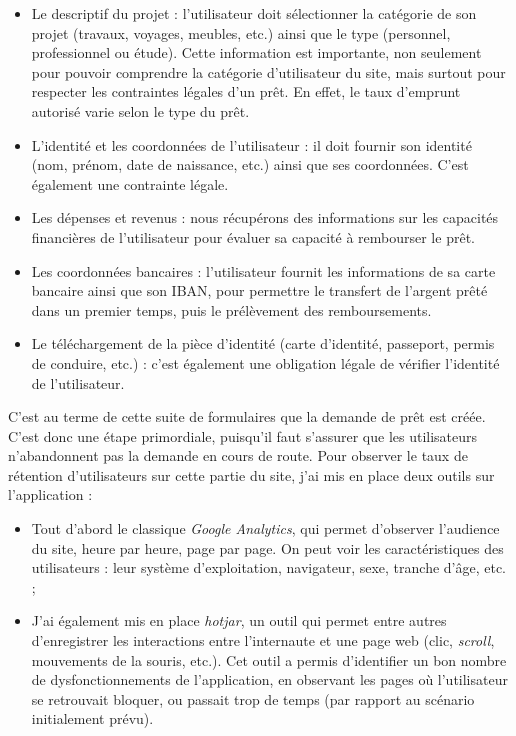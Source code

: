 \documentclass[12pt,a4paper]{article}
\providecommand{\tightlist}{%
  \setlength{\itemsep}{0pt}\setlength{\parskip}{0pt}}
\begin{document}
  \begin{itemize}
  \tightlist
  \item
    Le descriptif du projet : l'utilisateur doit sélectionner la catégorie
    de son projet (travaux, voyages, meubles, etc.) ainsi que le type
    (personnel, professionnel ou étude). Cette information est importante,
    non seulement pour pouvoir comprendre la catégorie d'utilisateur du
    site, mais surtout pour respecter les contraintes légales d'un prêt.
    En effet, le taux d'emprunt autorisé varie selon le type du prêt.
  \item
    L'identité et les coordonnées de l'utilisateur : il doit fournir son
    identité (nom, prénom, date de naissance, etc.) ainsi que ses
    coordonnées. C'est également une contrainte légale.
  \item
    Les dépenses et revenus : nous récupérons des informations sur les
    capacités financières de l'utilisateur pour évaluer sa capacité à
    rembourser le prêt.
  \item
    Les coordonnées bancaires : l'utilisateur fournit les informations de
    sa carte bancaire ainsi que son IBAN, pour permettre le transfert de
    l'argent prêté dans un premier temps, puis le prélèvement des
    remboursements.
  \item
    Le téléchargement de la pièce d'identité (carte d'identité, passeport,
    permis de conduire, etc.) : c'est également une obligation légale de
    vérifier l'identité de l'utilisateur.
  \end{itemize}

  \bigskip

  C'est au terme de cette suite de formulaires que la demande de prêt est
  créée. C'est donc une étape primordiale, puisqu'il faut s'assurer que
  les utilisateurs n'abandonnent pas la demande en cours de route. Pour
  observer le taux de rétention d'utilisateurs sur cette partie du site,
  j'ai mis en place deux outils sur l'application :

  \begin{itemize}
  \tightlist
  \item
    Tout d'abord le classique \emph{Google Analytics}, qui permet
    d'observer l'audience du site, heure par heure, page par page. On peut
    voir les caractéristiques des utilisateurs : leur système
    d'exploitation, navigateur, sexe, tranche d'âge, etc. ;
  \item
    J'ai également mis en place \emph{hotjar}, un outil qui permet entre
    autres d'enregistrer les interactions entre l'internaute et une page
    web (clic, \emph{scroll}, mouvements de la souris, etc.). Cet outil a
    permis d'identifier un bon nombre de dysfonctionnements de
    l'application, en observant les pages où l'utilisateur se retrouvait
    bloquer, ou passait trop de temps (par rapport au scénario
    initialement prévu).
  \end{itemize}
\end{document}

